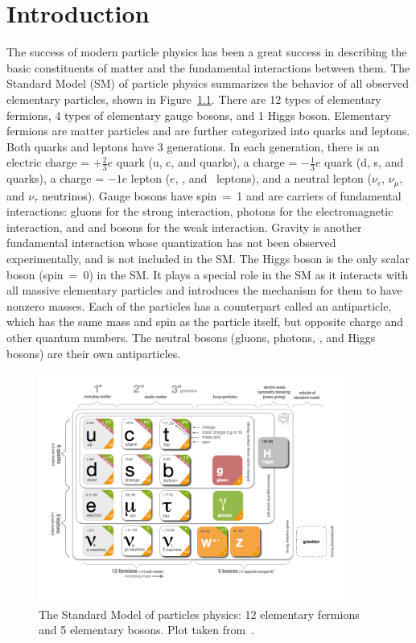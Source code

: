 \chapter{Introduction}

The success of modern particle physics has been a great success in describing the basic constituents of matter and the fundamental interactions between them.
The Standard Model (SM) of particle physics summarizes the behavior of all observed elementary particles, shown in Figure~\ref{fig:SM_table}.
There are 12 types of elementary fermions, 4 types of elementary gauge bosons, and 1 Higgs boson.
Elementary fermions are matter particles and are further categorized into quarks and leptons.
Both quarks and leptons have 3 generations.
In each generation, there is an electric charge = $+\frac{2}{3}e$ quark (u, c, and \Pqt quarks),
a charge = $-\frac{1}{3}e$ quark (d, s, and \Pqb quarks), 
a charge = $-1e$ lepton ($e$, \mu, and \tau ~leptons),
and a neutral lepton ($\nu_{e}$, $\nu_{\mu}$, and $\nu_{\tau}$ neutrinos).
Gauge bosons have spin~=~1 and are carriers of fundamental interactions: 
gluons for the strong interaction, photons for the electromagnetic interaction,
and \PW and \PZ bosons for the weak interaction.
Gravity is another fundamental interaction whose quantization has not been observed experimentally,
and is not included in the SM.
The Higgs boson is the only scalar boson (spin~=~0) in the SM.
It plays a special role in the SM as it interacts with all massive elementary particles 
and introduces the mechanism for them to have nonzero masses.
Each of the particles has a counterpart called an antiparticle, which has the same mass and spin as the particle itself, 
but opposite charge and other quantum numbers.
The neutral bosons (gluons, photons, \PZ, and Higgs bosons) are their own antiparticles.

\begin{figure}[!htb]
    \centering
    \includegraphics[width=0.9\textwidth]{pics/Intro/standard_model_cern.png}
    \caption{The Standard Model of particles physics: 12 elementary fermions and 5 elementary bosons.
             Plot taken from~\cite{SM_table_CERN}. }
    \label{fig:SM_table}
\end{figure}

